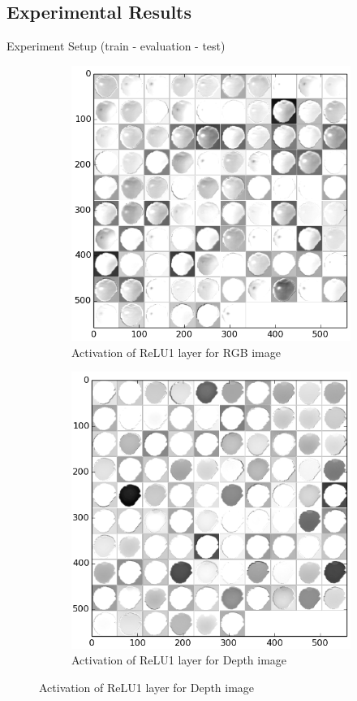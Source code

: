 \subsection{Experimental Results}
\label{subsec:exp_result}

Experiment Setup (train - evaluation - test)

\begin{figure}[htbp]
	\centering
	\begin{subfigure}[b]{0.45\linewidth}
		\includegraphics[width=\textwidth]{img/relu1_rgb.png}
		\caption{Activation of ReLU1 layer for RGB image}
	\end{subfigure}   	
	\begin{subfigure}[b]{0.45\linewidth}
		\includegraphics[width=\textwidth]{img/relu1_dep.png}
		\caption{Activation of ReLU1 layer for Depth image}
	\end{subfigure}
	

\end{figure}
